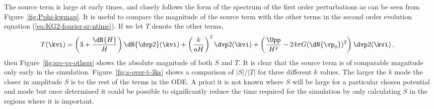 The source term is large at early times, and closely follows the form
of the spectrum of the first order perturbations as can be seen from
Figure~\ref{fig:Pphi-kwmap}.
%
It is useful to compare the magnitude of the source term with the
other terms in the second order evolution equation
(\ref{eq:KG2-fourier-sr-ntime}). If we let $T$ denote the other terms,
%
\begin{equation}
\label{eq:Tdefn}
 T(\kvi) = \left(3 + \frac{\dN{H}}{H}\right)
\dN{\dvp2}(\kvi)+ \left(\frac{k}{aH}\right)^2\dvp2(\kvi)
+\left(\frac{\Upp}{H^2}-{24 \pi G}(\dN{\vp_{0}})^2\right)
\dvp2(\kvi) \,,
\end{equation}
%
then Figure~\ref{fig:src-vs-others} shows the absolute magnitude of
both $S$ and $T$.  It is clear that the source term is of comparable
magnitude only early in the simulation.  Figure~\ref{fig:s-over-t-3ks}
shows a comparison of $|S|/|T|$ for three different $k$ values. The larger the
$k$ mode the closer
in amplitude $S$ is to the rest of the terms in the ODE.
A priori it is not known
where $S$ will be large for a particular chosen potential and mode but
once determined it could be possible to significantly reduce the time required
for the simulation by only calculating $S$ in the regions where it is
important.
%
